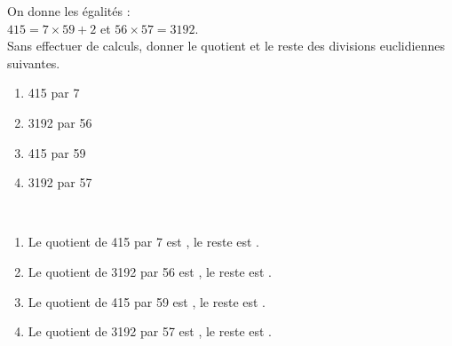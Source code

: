 \begin{exercice*}
    On donne les égalités : \\
    $415 = 7\times59+2$ \; et \; $56\times57 = \num{3 192}$. \\
    Sans effectuer de calculs, donner le quotient et le reste des divisions euclidiennes suivantes.
    \begin{multicols}{2}
    \begin{enumerate}
       \item 415 par 7
       \item \num{3 192} par 56
       \item 415 par 59
       \item \num{3 192} par 57
    \end{enumerate}
   \end{multicols}
 \end{exercice*} 
 \begin{corrige}
    \phantom{rrr}\\\smallskip
    \begin{changemargin}{-5mm}{-5mm}
    \begin{enumerate}
       \item Le quotient de 415 par 7 est {}, le reste est {}.
       \item Le quotient de \num{3 192} par 56 est {}, le reste est {}.
       \item Le quotient de 415 par 59 est {}, le reste est {}.
       \item Le quotient de \num{3 192} par 57 est {}, le reste est {}.
    \end{enumerate}
   \end{changemargin}
 \end{corrige}